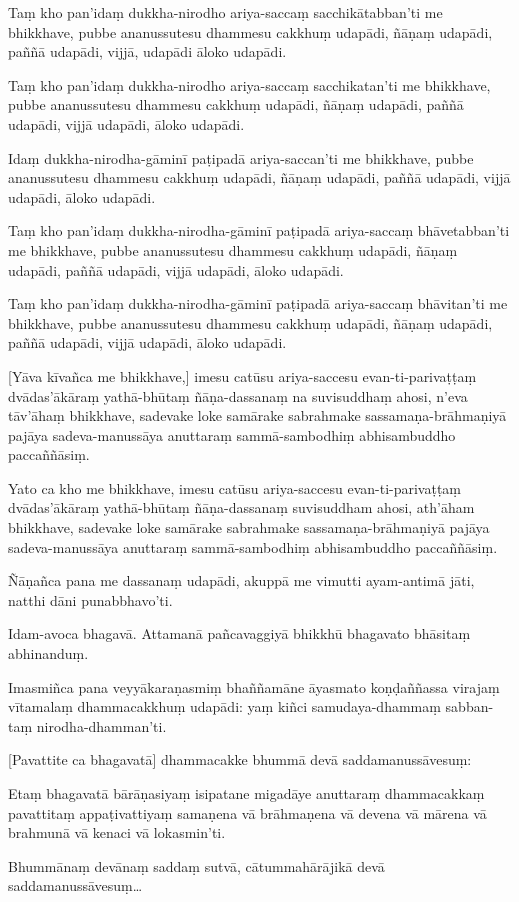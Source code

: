 Taṃ kho pan'idaṃ dukkha-nirodho ariya-saccaṃ sacchikātabban'ti me bhikkhave,
pubbe ananussutesu dhammesu cakkhuṃ udapādi, ñāṇaṃ udapādi, paññā
udapādi, vijjā, udapādi āloko udapādi.

Taṃ kho pan'idaṃ dukkha-nirodho ariya-saccaṃ sacchikatan'ti me bhikkhave,
pubbe ananussutesu dhammesu cakkhuṃ udapādi, ñāṇaṃ udapādi, paññā
udapādi, vijjā udapādi, āloko udapādi.

Idaṃ dukkha-nirodha-gāminī paṭipadā ariya-saccan'ti me bhikkhave, pubbe
ananussutesu dhammesu cakkhuṃ udapādi, ñāṇaṃ udapādi, paññā udapādi,
vijjā udapādi, āloko udapādi.

Taṃ kho pan'idaṃ dukkha-nirodha-gāminī paṭipadā ariya-saccaṃ bhāvetabban'ti
me bhikkhave, pubbe ananussutesu dhammesu cakkhuṃ udapādi, ñāṇaṃ
udapādi, paññā udapādi, vijjā udapādi, āloko udapādi.

Taṃ kho pan'idaṃ dukkha-nirodha-gāminī paṭipadā ariya-saccaṃ bhāvitan'ti me
bhikkhave, pubbe ananussutesu dhammesu cakkhuṃ udapādi, ñāṇaṃ udapādi,
paññā udapādi, vijjā udapādi, āloko udapādi.

[Yāva kīvañca me bhikkhave,] imesu catūsu ariya-saccesu evan-ti-parivaṭṭaṃ
dvādas'ākāraṃ yathā-bhūtaṃ ñāṇa-dassanaṃ na suvisuddhaṃ ahosi, n'eva tāv'āhaṃ
bhikkhave, sadevake loke samārake sabrahmake sassamaṇa-brāhmaṇiyā pajāya
sadeva-manussāya anuttaraṃ sammā-sambodhiṃ abhisambuddho paccaññāsiṃ.

Yato ca kho me bhikkhave, imesu catūsu ariya-saccesu evan-ti-parivaṭṭaṃ
dvādas'ākāraṃ yathā-bhūtaṃ ñāṇa-dassanaṃ suvisuddham ahosi, ath'āham
bhikkhave, sadevake loke samārake sabrahmake sassamaṇa-brāhmaṇiyā pajāya
sadeva-manussāya anuttaraṃ sammā-sambodhiṃ abhisambuddho paccaññāsiṃ.

Ñāṇañca pana me dassanaṃ udapādi, akuppā me vimutti ayam-antimā jāti,
natthi dāni punabbhavo'ti.

Idam-avoca bhagavā. Attamanā pañcavaggiyā bhikkhū bhagavato bhāsitaṃ
abhinanduṃ.

Imasmiñca pana veyyākaraṇasmiṃ bhaññamāne āyasmato koṇḍaññassa virajaṃ
vītamalaṃ dhammacakkhuṃ udapādi: yaṃ kiñci samudaya-dhammaṃ sabban-taṃ
nirodha-dhamman'ti.

[Pavattite ca bhagavatā] dhammacakke bhummā devā saddamanussāvesuṃ:

Etaṃ bhagavatā bārāṇasiyaṃ isipatane migadāye anuttaraṃ dhammacakkaṃ
pavattitaṃ appaṭivattiyaṃ samaṇena vā brāhmaṇena vā devena vā mārena vā
brahmunā vā kenaci vā lokasmin'ti.

\sidepar{\pointerMark}%
Bhummānaṃ devānaṃ saddaṃ sutvā, cātummahārājikā devā
saddamanussāvesuṃ\ldots

